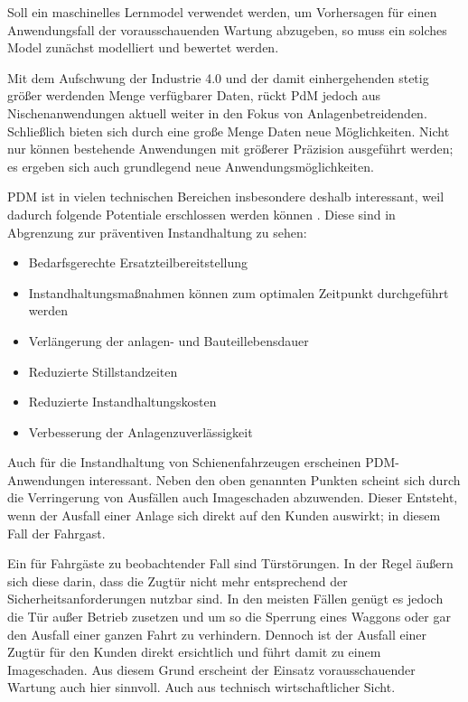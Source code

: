 Soll ein maschinelles Lernmodel verwendet werden, um Vorhersagen für einen Anwendungsfall der vorausschauenden Wartung abzugeben, so muss ein solches Model zunächst modelliert und bewertet werden.

Mit dem Aufschwung der Industrie 4.0 und der damit einhergehenden stetig größer werdenden Menge verfügbarer Daten, rückt PdM jedoch aus Nischenanwendungen aktuell weiter in den Fokus von Anlagenbetreidenden. Schließlich bieten sich durch eine große Menge Daten neue Möglichkeiten. Nicht nur können bestehende Anwendungen mit größerer Präzision ausgeführt werden; es ergeben sich auch grundlegend neue Anwendungsmöglichkeiten.

PDM ist in vielen technischen Bereichen insbesondere deshalb interessant, weil  dadurch folgende Potentiale erschlossen werden können \cite[S.~31]{Holzel.2019}. Diese sind in Abgrenzung zur präventiven Instandhaltung zu sehen:
\begin{itemize}
	\item Bedarfsgerechte Ersatzteilbereitstellung
	\item Instandhaltungsmaßnahmen können zum optimalen Zeitpunkt durchgeführt werden
	\item Verlängerung der anlagen- und Bauteillebensdauer
	\item Reduzierte Stillstandzeiten
	\item Reduzierte Instandhaltungskosten
	\item Verbesserung der Anlagenzuverlässigkeit
\end{itemize}

Auch für die Instandhaltung von Schienenfahrzeugen erscheinen PDM-Anwendungen interessant. Neben den oben genannten Punkten scheint sich durch die Verringerung von Ausfällen auch Imageschaden abzuwenden. Dieser Entsteht, wenn  der Ausfall einer Anlage sich direkt auf den Kunden auswirkt; in diesem Fall der Fahrgast.

Ein für Fahrgäste zu beobachtender Fall sind Türstörungen. In der Regel äußern sich diese darin, dass die Zugtür nicht mehr entsprechend der Sicherheitsanforderungen nutzbar sind. In den meisten Fällen genügt es jedoch die Tür außer Betrieb zusetzen und um so die Sperrung eines Waggons oder gar den Ausfall einer ganzen Fahrt zu verhindern. Dennoch ist der Ausfall einer Zugtür für den Kunden direkt ersichtlich und führt damit zu einem Imageschaden. Aus diesem Grund erscheint der Einsatz vorausschauender Wartung auch hier sinnvoll. Auch aus technisch wirtschaftlicher Sicht.

